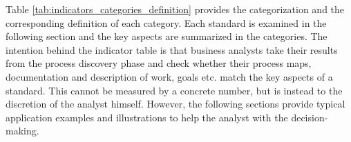 Table \ref{tab:indicators_categories_definition} provides the categorization and the corresponding definition of each category. Each standard is examined in the following section and the key aspects are summarized in the categories. 
The intention behind the indicator table is that business analysts take their results from the process discovery phase and check whether their process maps, documentation and description of work, goals etc. match the key aspects of a standard. This cannot be measured by a concrete number, but is instead to the discretion of the analyst himself. However, the following sections provide typical application examples and illustrations to help the analyst with the decision-making. 
\begin{table}[]
\centering
{}
\end{table}
